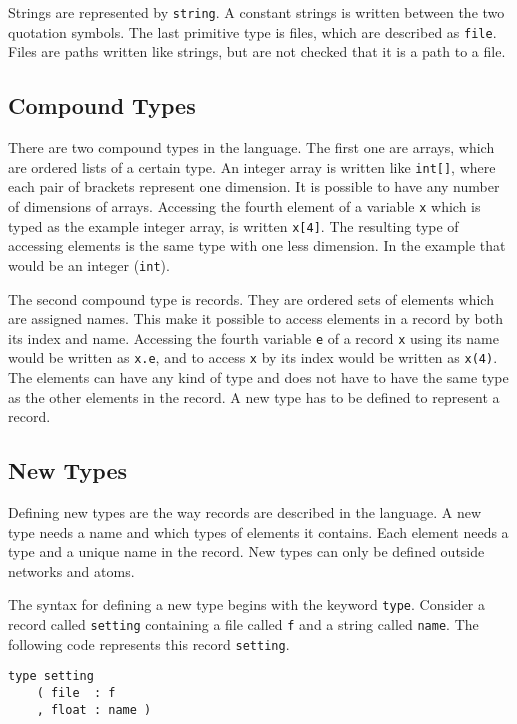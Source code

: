 Strings are represented by \verb#string#. A constant strings is
written between the two quotation symbols. The last primitive type is
files, which are described as \verb#file#. Files are paths written
like strings, but are not checked that it is a path to a file.

\subsection{Compound Types}\label{sec:compound}
There are two compound types in the language. The first one are
arrays, which are ordered lists of a certain type. An integer array is
written like \verb#int[]#, where each pair of brackets represent one
dimension. It is possible to have any number of dimensions of
arrays. Accessing the fourth element of a variable \verb#x# which is
typed as the example integer array, is written \verb#x[4]#. The
resulting type of accessing elements is the same type with one less
dimension. In the example that would be an integer (\verb#int#).

The second compound type is records. They are ordered sets of elements
which are assigned names. This make it possible to access elements in
a record by both its index and name. Accessing the fourth variable
\verb#e# of a record \verb#x# using its name would be written as
\verb#x.e#, and to access \verb#x# by its index would be written as
\verb#x(4)#. The elements can have any kind of type and does not have
to have the same type as the other elements in the record. A new type
has to be defined to represent a record.

\subsection{New Types}
Defining new types are the way records are described in the
language. A new type needs a name and which types of elements it
contains. Each element needs a type and a unique name in the
record. New types can only be defined outside networks and atoms.

The syntax for defining a new type begins with the keyword
\verb#type#. Consider a record called \verb#setting# containing a file
called \verb#f# and a string called \verb#name#. The following code
represents this record \verb#setting#.

\begin{verbatim}
type setting
    ( file  : f
    , float : name )
\end{verbatim}

